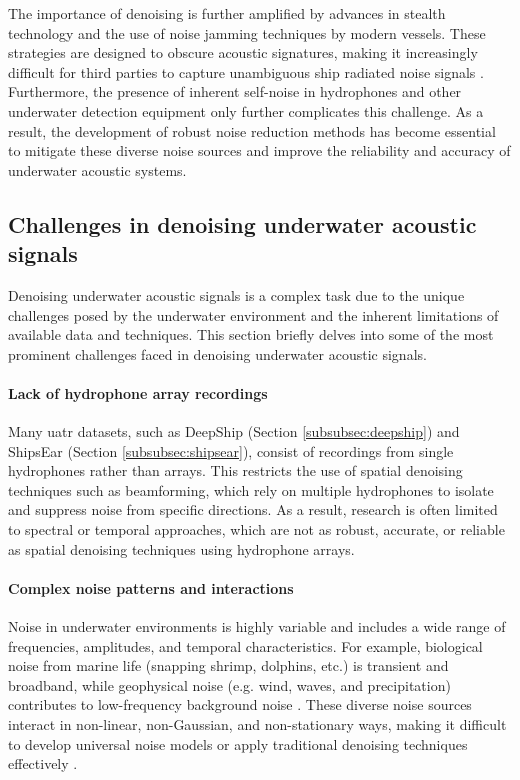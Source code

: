 The importance of denoising is further amplified by advances in stealth technology and the use of noise jamming techniques by modern vessels. These strategies are designed to obscure acoustic signatures, making it increasingly difficult for third parties to capture unambiguous ship radiated noise signals \cite{li_research_2023}. Furthermore, the presence of inherent self-noise in hydrophones and other underwater detection equipment only further complicates this challenge. As a result, the development of robust noise reduction methods has become essential to mitigate these diverse noise sources and improve the reliability and accuracy of underwater acoustic systems.

\subsection{Challenges in denoising underwater acoustic signals}

Denoising underwater acoustic signals is a complex task due to the unique challenges posed by the underwater environment and the inherent limitations of available data and techniques. This section briefly delves into some of the most prominent challenges faced in denoising underwater acoustic signals.

\paragraph{Lack of hydrophone array recordings} 
Many \acrlong{uatr} datasets, such as DeepShip (Section \ref{subsubsec:deepship}) and ShipsEar (Section \ref{subsubsec:shipsear}), consist of recordings from single hydrophones rather than arrays. This restricts the use of spatial denoising techniques such as beamforming, which rely on multiple hydrophones to isolate and suppress noise from specific directions. As a result, research is often limited to spectral or temporal approaches, which are not as robust, accurate, or reliable as spatial denoising techniques using hydrophone arrays.

\paragraph{Complex noise patterns and interactions}
Noise in underwater environments is highly variable and includes a wide range of frequencies, amplitudes, and temporal characteristics. For example, biological noise from marine life (snapping shrimp, dolphins, etc.) is transient and broadband, while geophysical noise (e.g. wind, waves, and precipitation) contributes to low-frequency background noise \cite{gao_underwater_2024}. These diverse noise sources interact in non-linear, non-Gaussian, and non-stationary ways, making it difficult to develop universal noise models or apply traditional denoising techniques effectively \cite{song_method_2024, li_research_2023}.

